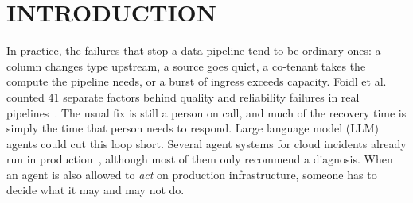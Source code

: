 \section{INTRODUCTION}\label{sec:intro}

In practice, the failures that stop a data pipeline tend to be ordinary ones: a column changes type upstream, a source goes quiet, a co-tenant
takes the compute the pipeline needs, or a burst of ingress exceeds capacity. Foidl et al. counted 41
separate factors behind quality and reliability failures in real pipelines~\cite{foidl2024datapipeline}.
The usual fix is still a person on call, and much of the recovery time is simply the time that person
needs to respond. Large language model (LLM) agents could cut this loop short. Several agent systems
for cloud incidents already run in production~\cite{chen2024rcacopilot,wang2023rcagent,luo2025opsagent},
although most of them only recommend a diagnosis. When an agent is also allowed to \emph{act} on
production infrastructure, someone has to decide what it may and may not do.

